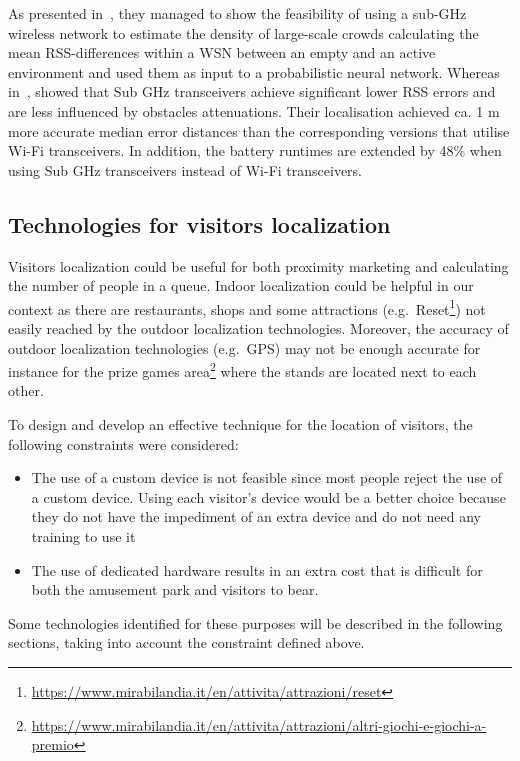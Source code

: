 As presented in~\cite{denis2018large}, they managed to show the feasibility of using a sub-GHz wireless network to estimate the density of
large-scale crowds calculating the mean RSS-differences within a WSN between an empty and an active environment and used them as input to a
probabilistic neural network. Whereas in~\cite{fudickar2014comparing}, showed that Sub GHz transceivers achieve significant lower RSS errors and are
less influenced by obstacles attenuations. Their localisation achieved ca. 1 m more accurate median error distances than the corresponding versions
that utilise Wi-Fi transceivers. In addition, the battery runtimes are extended by 48\% when using Sub GHz transceivers instead of Wi-Fi
transceivers.

\subsection{Technologies for visitors localization}\label{sec:technologies}
Visitors localization could be useful for both proximity marketing and calculating the number of people in a queue. Indoor localization could be
helpful in our context as there are restaurants, shops and some attractions (e.g.\
Reset\footnote{\url{https://www.mirabilandia.it/en/attivita/attrazioni/reset}}) not easily reached by the outdoor localization technologies.
Moreover, the accuracy of outdoor localization technologies (e.g.\ GPS) may not be enough accurate for instance for the prize games
area\footnote{\url{https://www.mirabilandia.it/en/attivita/attrazioni/altri-giochi-e-giochi-a-premio}} where the stands are located next to each
other.

To design and develop an effective technique for the location of visitors, the following constraints were considered:
\begin{itemize}
	\item The use of a custom device is not feasible since most people reject the use of a custom device. Using each visitor's device would be a better choice
	      because they do not have the impediment of an extra device and do not need any training to use it
	\item The use of dedicated hardware results in an extra cost that is difficult for both the amusement park and visitors to bear.
\end{itemize}

Some technologies identified for these purposes will be described in the following sections, taking into account the constraint defined above.


